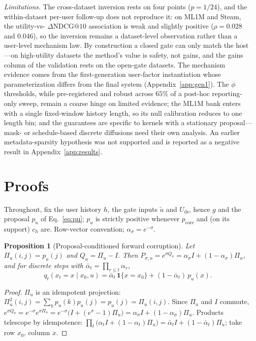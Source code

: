\documentclass[letterpaper]{article}
\newcommand{\pcore}{p_{\mathrm{core}}}
\newcommand{\ch}{c_{h}}
\newcommand{\pu}{p_{u}}
\newcommand{\ut}{\tilde{u}}
\newcommand{\Uds}{U_{\mathrm{ds}}}
\newtheorem{proposition}{Proposition}
\begin{document}
\emph{Limitations.} The cross-dataset inversion rests on four points
($p{=}1/24$), and the within-dataset per-user follow-up does not
reproduce it: on ML1M and Steam, the utility-vs-
$\Delta\mathrm{NDCG}@10$ association is weak and slightly positive
($\rho=0.028$ and $0.046$), so the inversion remains a dataset-level
observation rather than a user-level mechanism law. By construction a
closed gate can only match the host---on high-utility datasets the
method's value is safety, not gains, and the gains column of the
validation rests on the open-gate datasets. The mechanism evidence comes from the
first-generation user-factor instantiation whose parameterization
differs from the final system (Appendix~\ref{app:gen1}). The $\phi$
thresholds, while pre-registered and robust across $65\%$ of a
post-hoc reporting-only sweep, remain a coarse hinge on limited
evidence; the ML1M bank enters with a single fixed-window history
length, so its null calibration reduces to one length bin; and the
guarantees are specific to kernels with a stationary
proposal---mask- or schedule-based discrete diffusions need their own
analysis. An earlier metadata-sparsity hypothesis was not supported and
is reported as a negative result in Appendix~\ref{app:results}.

\clearpage
\appendix

\section{Proofs}
\label{app:proofs}

Throughout, fix the user history $h$, the gate inputs $\ut$ and
$\Uds$, hence $g$ and the proposal $\pu$ of Eq.~\eqref{eq:pu}; $\pu$ is
strictly positive whenever $\pcore$ and (on its support) $\ch$ are.
Row-vector convention; $\alpha_\sigma=e^{-\sigma}$.

\begin{proposition}[Proposal-conditioned forward corruption]
\label{prop:forward-app}
Let $\Pi_u(i,j)=\pu(j)$ and $Q_u=\Pi_u-I$. Then
$P_{\sigma,u}=e^{\sigma Q_u}=\alpha_\sigma I+(1-\alpha_\sigma)\Pi_u$,
and for discrete steps with $\bar\alpha_t=\prod_{r\le t}\alpha_r$,
\[
  q_t(x_t{=}x\mid x_0,u)=\bar\alpha_t\,\mathbf{1}\{x{=}x_0\}
  +(1-\bar\alpha_t)\,\pu(x).
\]
\end{proposition}
\begin{proof}
$\Pi_u$ is an idempotent projection: $\Pi_u^2(i,j)=\sum_k
\pu(k)\pu(j)=\pu(j)=\Pi_u(i,j)$. Since $\Pi_u$ and $I$ commute,
$e^{\sigma Q_u}=e^{-\sigma}e^{\sigma\Pi_u}
=e^{-\sigma}\big(I+(e^{\sigma}-1)\Pi_u\big)
=\alpha_\sigma I+(1-\alpha_\sigma)\Pi_u$.
Products telescope by idempotence:
$\prod_t\big(\alpha_t I+(1-\alpha_t)\Pi_u\big)
=\bar\alpha_t I+(1-\bar\alpha_t)\Pi_u$; take row $x_0$, column $x$.
\end{proof}
\end{document}
